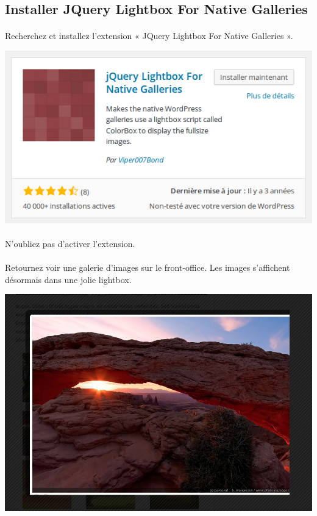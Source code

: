 \documentclass[10pt,a4paper]{article}
\begin{document}
\subsection{Installer JQuery Lightbox For Native Galleries}
\paragraph{}Recherchez et installez l'extension « JQuery Lightbox For Native Galleries ».
\begin{center}
\includegraphics[scale=0.3]{img/0260.png}
\end{center}
\paragraph{}N'oubliez pas d'activer l'extension.
\paragraph{}Retournez voir une galerie d'images sur le front-office. Les images s'affichent désormais dans une jolie lightbox.
\begin{center}
\includegraphics[scale=0.3]{img/0261.png}
\end{center}
\newpage
\end{document}
